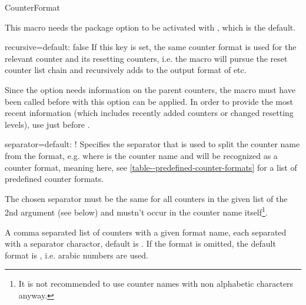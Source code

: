 \documentclass[12pt,a4paper,oneside]{article}
\makeatletter
\newcommand{\chdocextractversion}[1]{%
  \@nameuse{#1}%
}
\newcommand{\CHDocNew}[1]{%
  \tcbdocmarginnote[doclang/new={N},
  colframe=blue,
  halign=left,
  colback={blue!20!white},
  fontupper={\tiny}
  ]{%
    \chdocextractversion{xassoccntversion#1}%
  }%
}
\makeatother
\begin{document}
\begin{docCommand}{CounterFormat}{}\CHDocNew{1.4}

\begin{marker}
  This macro needs the package option  to be activated with , which is the default. 
\end{marker}

\begin{codeoptionsenum}
\item {}
  \begin{docKey}[][]{recursive}{=}{default: false}
    If this key is set, the same counter format is used for the relevant counter and its resetting counters, i.e. the macro will pursue the reset counter list chain and recursively adds  to the output format of  etc. 
    \begin{marker}
      Since the  option needs information on the parent counters, the macro  must have been called before  with this option can be applied. In order to provide the most recent information (which includes recently added counters or changed resetting levels), use  just before . 
      \end{marker}
  \end{docKey}
  \begin{docKey}[][]{separator}{=}{default: !}
    Specifies the separator that is used to split the counter name from the format, e.g.  where  is the counter name and  will be recognized as a counter format, meaning  here, see \cref{table--predefined-counter-formats} for a list of predefined counter formats. 
    
    \begin{marker}
      The chosen separator must be the same for all counters in the given list of the 2nd argument (see below) and mustn't occur in the counter name itself\footnote{It is not recommended to use counter names with non alphabetic characters anyway.}.
      \end{marker}
    \end{docKey}
  \item {} 
    A comma separated list of counters with a given format name, each separated with a separator charactor, default is \meta{!}. If the format is omitted, the default format is , i.e. arabic numbers are used. 
  \end{codeoptionsenum}
    
\end{docCommand}
\end{document}
